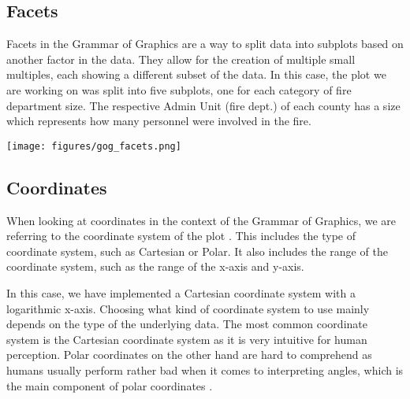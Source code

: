 \vspace{-2mm}

\subsection*{Facets}
\vspace{-2mm}
\begin{minipage}[t]{0.6\textwidth}
    Facets in the Grammar of Graphics are a way to split data into subplots based on another factor 
    in the data. They allow for the creation of multiple small multiples, each showing a 
    different subset of the data.
    In this case, the plot we are working on was split into five subplots, one for each category of fire department size.
    The respective Admin Unit (fire dept.) of each county has a size which represents how many personnel were involved 
    in the fire.
    \hspace{1cm}
\end{minipage}%
\begin{minipage}[t]{0.4\textwidth}
    \vspace{-20pt}
    \texttt{[image: figures/gog\_facets.png]}
\end{minipage}

\vspace{-2mm}

\subsection*{Coordinates}
\vspace{-2mm}
When looking at coordinates in the context of the Grammar of Graphics, we are referring to 
the coordinate system of the plot \cite{wilkinsonCoordinates2005}. This includes the type of coordinate system, such as Cartesian 
or Polar. It also includes the range of the coordinate system, such as the range of the x-axis and y-axis.

In this case, we have implemented a Cartesian coordinate system with a logarithmic x-axis. 
Choosing what kind of coordinate system to use mainly depends on the type of the underlying data.
The most common coordinate system is the Cartesian coordinate system as it is very intuitive for 
human perception. Polar coordinates on the other hand are hard to comprehend as humans usually perform
rather bad when it comes to interpreting angles, which is the main component of polar coordinates \cite[Chapter~7]{alma99116746755205518}.